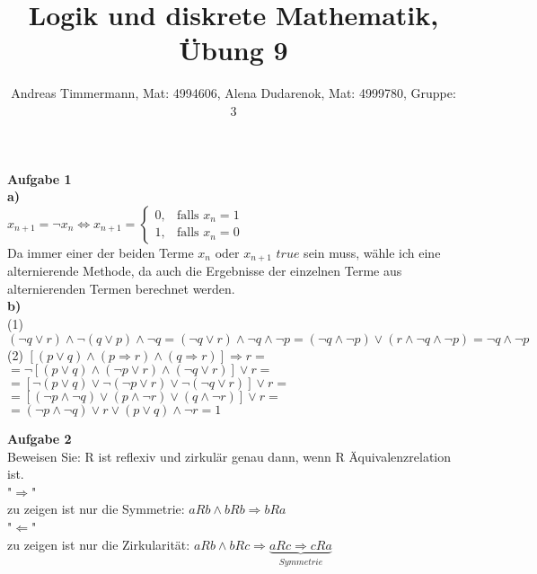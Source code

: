 \documentclass[a4paper]{scrartcl}
\title{Logik und diskrete Mathematik, Übung 9}
\author{Andreas Timmermann, Mat: 4994606, Alena Dudarenok, Mat: 4999780, Gruppe: 3}
\begin{document}
	\maketitle
	\begin{flushleft}
		\textbf{Aufgabe 1}\\
		\textbf{a)}\\
		$x_{n+1} = \neg x_{n} \Leftrightarrow x_{n+1}=\begin{cases} 0, &\text{falls } x_{n} = 1 \\ 1, &\text{falls } x_{n} = 0 \end{cases}$\\[1em]
		Da immer einer der beiden Terme $x_n$ oder $x_{n+1}$ $true$ sein muss, wähle ich eine alternierende Methode, da auch die Ergebnisse der einzelnen Terme aus alternierenden Termen berechnet werden.\\
		\textbf{b)}\\
		(1) $(\neg q\vee r)\wedge \neg(q \vee p)\wedge \neg q = (\neg q\vee r)\wedge \neg q \wedge \neg p = (\neg q \wedge \neg p) \vee (r \wedge \neg q \wedge \neg p) = \neg q \wedge \neg p$\\
		(2) $[(p\vee q)\wedge(p\Rightarrow r)\wedge(q\Rightarrow r)]\Rightarrow r =$\\
		$= \neg[(p\vee q)\wedge(\neg p\vee r)\wedge(\neg q\vee r)]\vee r = $\\
		$= [\neg(p\vee q)\vee \neg(\neg p\vee r)\vee \neg(\neg q\vee r)]\vee r=$\\
		$= [(\neg p\wedge \neg q)\vee (p\wedge \neg r)\vee (q\wedge \neg r)]\vee r =$\\
		$= (\neg p\wedge \neg q) \vee r \vee (p \vee q)\wedge \neg r = 1$\\[1em]

	\end{flushleft}
	\begin{flushleft}
		\textbf{Aufgabe 2}\\
		Beweisen Sie: R ist reflexiv und zirkulär genau dann, wenn R Äquivalenzrelation ist.\\[1em]
		"$\Rightarrow$"\\
		zu zeigen ist nur die Symmetrie: $aRb \wedge bRb \Rightarrow bRa$\\[1em]
		"$\Leftarrow$"\\
		zu zeigen ist nur die Zirkularität: $aRb \wedge bRc \Rightarrow \underbrace{aRc \Rightarrow cRa}_{Symmetrie}$\\[1em]
		
	\end{flushleft}
\end{document}
